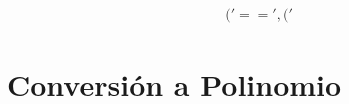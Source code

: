 \documentclass[10pt, a4paper]{article}
\begin{document}
\begin{align*}
('==', ('%
\end{align*}\part{Conversión a Polinomio}
\end{document}
